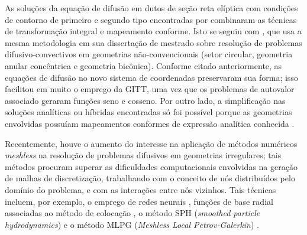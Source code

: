 As soluções da equação de difusão em dutos de seção reta elíptica com condições de contorno de primeiro e segundo tipo encontradas por
 \citet{trabalho_maia_1, trabalho_maia_2} combinaram as técnicas de transformação integral e mapeamento conforme. 
Isto se seguiu com \cite{tese_antonini}, que usa a mesma metodologia em sua dissertação de mestrado sobre resolução de problemas difusivo-convectivos em geometrias não-convencionais (setor circular, geometria anular
concêntrica e geometria bicônica). Conforme citado anteriormente, as equações de difusão no novo sistema de coordenadas preservaram sua forma; isso facilitou em
muito o emprego da GITT, uma vez que os problemas de autovalor associado geraram funções seno e cosseno. Por outro lado, a
simplificação nas soluções analíticas ou híbridas encontradas só foi possível porque as geometrias envolvidas possuíam mapeamentos conformes de expressão analítica
conhecida \citep{livro_brown}.

Recentemente, houve o aumento do interesse na aplicação de métodos numéricos \textit{meshless} na resolução
de problemas difusivos em geometrias irregulares; tais métodos procuram superar as dificuldades computacionais envolvidas na geração
de malhas de discretização, trabalhando com o conceito de nós distribuídos pelo domínio do problema, e com as interações entre nós
vizinhos. Tais técnicas incluem, por exemplo, o emprego de redes neurais \citep{artigo_deng, artigo_heidari}, funções de base
radial associadas ao método de colocação \citep{artigo_chen, artigo_dai}, o método SPH (\textit{smoothed particle hydrodynamics}) \citep{artigo_vishwakarma} e o método MLPG (\textit{Meshless Local Petrov-Galerkin})
\citep{artigo_li}.

